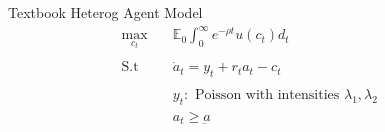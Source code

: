 \documentclass[10pt]{beamer} %
\theoremstyle{plain}
\theoremstyle{definition}
\theoremstyle{remark}
\begin{document}
\begin{frame}{Textbook Heterog Agent Model}{}  
\begin{align*}
    \max_{ c_t } \quad & \mathbb{E}_0 \int_{0}^{\infty} e^{-\rho t} u( c_t) d_t & \\ \ \\
\text{S.t } \quad   & \dot{a}_t = y_t  + r_t a_t - c_t & \\ \ \\
              & y_t : \text{ Poisson with intensities $\lambda_1, \lambda_2$ } &         \\ 
              & a_t \ge \underbar{a} &
\end{align*}

\end{frame}
\end{document}
